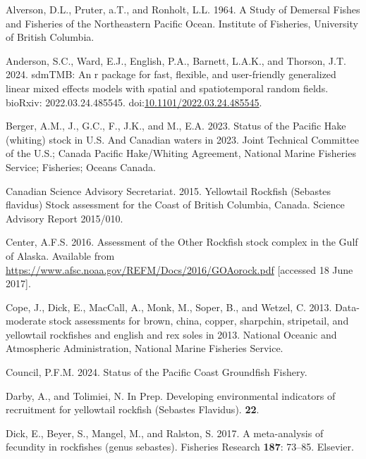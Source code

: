\documentclass[
]{scrartcl}
\newlength{\cslhangindent}
\newenvironment{CSLReferences}[2] %
 {\begin{list}{}{%
  \setlength{\itemindent}{0pt}
  \setlength{\leftmargin}{0pt}
  \setlength{\parsep}{0pt}
  \ifodd #1
   \setlength{\leftmargin}{\cslhangindent}
   \setlength{\itemindent}{-1\cslhangindent}
  \fi
  \setlength{\itemsep}{#2\baselineskip}}}
 {\end{list}}
\begin{document}
\label{refs}
\begin{CSLReferences}{1}{0}
Alverson, D.L., Pruter, a.T., and Ronholt, L.L. 1964. {A Study of
Demersal Fishes and Fisheries of the Northeastern Pacific Ocean}.
Institute of Fisheries, University of British Columbia.

Anderson, S.C., Ward, E.J., English, P.A., Barnett, L.A.K., and Thorson,
J.T. 2024. sdmTMB: An r package for fast, flexible, and user-friendly
generalized linear mixed effects models with spatial and spatiotemporal
random fields. bioRxiv: 2022.03.24.485545.
doi:\href{https://doi.org/10.1101/2022.03.24.485545}{10.1101/2022.03.24.485545}.

Berger, A.M., J., G.C., F., J.K., and M., E.A. 2023. Status of the
{P}acific {H}ake (whiting) stock in {U}.{S}. And {C}anadian waters in
2023. Joint Technical Committee of the U.S.; Canada Pacific Hake/Whiting
Agreement, National Marine Fisheries Service; Fisheries; Oceans Canada.

Canadian Science Advisory Secretariat. 2015. {Yellowtail Rockfish
(Sebastes flavidus) Stock assessment for the Coast of British Columbia,
Canada}. {Science Advisory Report 2015/010}.

Center, A.F.S. 2016. {Assessment of the Other Rockfish stock complex in
the Gulf of Alaska}. Available from
\url{https://www.afsc.noaa.gov/REFM/Docs/2016/GOAorock.pdf} {[}accessed
18 June 2017{]}.

Cope, J., Dick, E., MacCall, A., Monk, M., Soper, B., and Wetzel, C.
2013. Data-moderate stock assessments for brown, china, copper,
sharpchin, stripetail, and yellowtail rockfishes and english and rex
soles in 2013. National Oceanic and Atmospheric Administration, National
Marine Fisheries Service.

Council, P.F.M. 2024. {Status of the Pacific Coast Groundfish Fishery}.

Darby, A., and Tolimiei, N. In Prep. {Developing environmental
indicators of recruitment for yellowtail rockfish (Sebastes Flavidus)}.
\textbf{22}.

Dick, E., Beyer, S., Mangel, M., and Ralston, S. 2017. A meta-analysis
of fecundity in rockfishes (genus sebastes). Fisheries Research
\textbf{187}: 73--85. Elsevier.


\end{CSLReferences}
\end{document}
